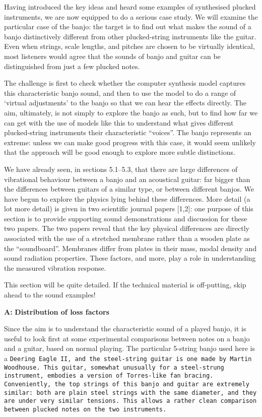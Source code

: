 

  Having introduced the key ideas and heard some examples of synthesised 
  plucked instruments, we are now equipped to do a serious case study. We will 
  examine the particular case of the banjo: the target is to find out what 
  makes the sound of a banjo distinctively different from other plucked-string 
  instruments like the guitar. Even when strings, scale lengths, and pitches 
  are chosen to be virtually identical, most listeners would agree that the 
  sounds of banjo and guitar can be distinguished from just a few plucked 
  notes. 

  The challenge is first to check whether the computer synthesis model captures 
  this characteristic banjo sound, and then to use the model to do a range of 
  `virtual adjustments' to the banjo so that we can hear the effects directly. 
  The aim, ultimately, is not simply to explore the banjo as such, but to find 
  how far we can get with the use of models like this to understand what gives 
  different plucked-string instruments their characteristic ``voices''. The 
  banjo represents an extreme: unless we can make good progress with this case, 
  it would seem unlikely that the approach will be good enough to explore more 
  subtle distinctions. 

  We have already seen, in sections 5.1--5.3, that there are large differences 
  of vibrational behaviour between a banjo and an acoustical guitar: far bigger 
  than the differences between guitars of a similar type, or between different 
  banjos. We have begun to explore the physics lying behind these differences. 
  More detail (a lot more detail) is given in two scientific journal papers 
  [1,2]: one purpose of this section is to provide supporting sound 
  demonstrations and discussion for these two papers. The two papers reveal 
  that the key physical differences are directly associated with the use of a 
  stretched membrane rather than a wooden plate as the ``soundboard''. 
  Membranes differ from plates in their mass, modal density and sound radiation 
  properties. These factors, and more, play a role in understanding the 
  measured vibration response. 

  This section will be quite detailed. If the technical material is 
  off-putting, skip ahead to the sound examples! 

  \textbf{A:} \textbf{Distribution of loss factors} 

  Since the aim is to understand the characteristic sound of a played banjo, it 
  is useful to look first at some experimental comparisons between notes on a 
  banjo and a guitar, based on normal playing. The particular 5-string banjo 
  used here is a \tt{}Deering Eagle II\rm{}, and the steel-string guitar is one 
  made by \tt{}Martin Woodhouse\rm{}. This guitar, somewhat unusually for a 
  steel-strung instrument, embodies a version of Torres-like fan bracing. 
  Conveniently, the top strings of this banjo and guitar are extremely similar: 
  both are plain steel strings with the same diameter, and they are under very 
  similar tensions. This allows a rather clean comparison between plucked notes 
  on the two instruments. 

